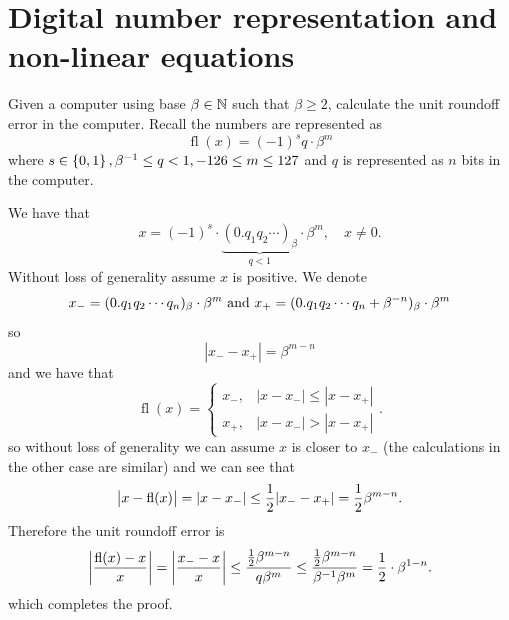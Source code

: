 \documentclass[11pt, a4paper]{article}
\DeclareMathOperator{\fl}{fl}
\begin{document}
\maketitle
\newpage
\tableofcontents
\newpage

\section{Digital number representation and non-linear equations}

\begin{exercise}
  Given a computer using base $\beta \in \mathbb{N}$ such that $\beta \geq 2$,
  calculate the unit roundoff error in the computer.
  Recall the numbers are represented as
  \[
    \fl(x) = (-1)^{s} q \cdot \beta^{m}
  \]
  where $s \in \left\{0,1\right\}, \beta^{-1} \le q < 1, -126 \le m \le 127$ and
  $q$ is represented as $n$ bits in the computer.
\end{exercise}
\begin{solution}
  We have that
  \[
    x =
    (-1)^{s} \cdot
    \underbrace{(0 . q_1 q_2 \cdots)_{\beta}}_{q < 1} \cdot
    \beta^{m},\quad x \neq 0.
  \]
  Without loss of generality assume $x$ is positive.
  We denote
  \[
    x_- =
    (0 . q_1 q_2 \cdots q_n)_{\beta} \cdot
    \beta^{m}
    \text{ and }
    x_+ =
    (0 . q_1 q_2 \cdots q_n + \beta^{-n})_{\beta} \cdot
    \beta^{m}
  \]
  so
  \[
    |x_- - x_+| = \beta^{m - n}
  \]
  and we have that
  \[
    \fl(x) =
    \begin{cases}
      x_-, &|x - x_-| \le |x - x_+| \\
      x_+, &|x - x_-| > |x - x_+|
    \end{cases}.
  \]
  so without loss of generality we can assume $x$ is closer to $x_-$
  (the calculations in the other case are similar) and we can see that
  \[
    \abs{x - \fl(x)} =
    \abs{x - x_-} \le
    \half |x_- - x_+| =
    \half \beta^{m - n}.
  \]
  Therefore the unit roundoff error is
  \[
    \abs{\frac{\fl(x) - x}{x}} =
    \abs{\frac{x_- - x}{x}} \le
    \frac{\half \beta^{m - n}}{q \beta^{m}} \le
    \frac{\half \beta^{m - n}}{\beta^{-1} \beta^{m}} =
    \half \cdot \beta^{1 - n}.
  \]
  which completes the proof.
\end{solution}
\end{document}
